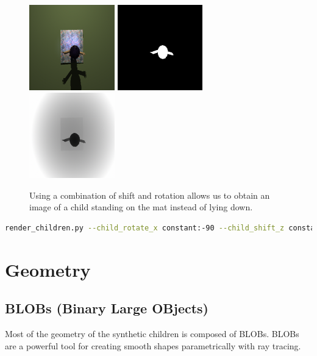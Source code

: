 \documentclass{article}
\begin{document}
\begin{figure}[htbp]
    \centering
    \includegraphics[height=3.7cm]{plots/child_000000_rgb_090c.png}
    \includegraphics[height=3.7cm]{plots/child_000000_seg_090c.png}
    \includegraphics[height=3.7cm]{plots/child_000000_dpt_090c.png}
    \caption{Using a combination of shift and rotation allows us to obtain an image of a child standing on the mat instead of lying down.}
    \label{fig:standing}
\end{figure}

\begin{lstlisting}[language=bash]
render_children.py --child_rotate_x constant:-90 --child_shift_z constant:0.9 --child_shift_y constant:0.4 --camera_distance constant:11\end{lstlisting}

\section{Geometry}

\subsection{BLOBs (Binary Large OBjects)}

Most of the geometry of the synthetic children is composed of BLOBs. BLOBs are a powerful tool for creating smooth shapes parametrically with ray tracing.
\end{document}
